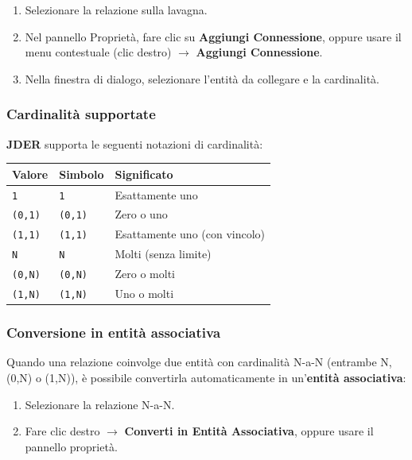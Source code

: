 \documentclass[a4paper,11pt]{article}
\newcommand{\uielement}[1]{\textbf{#1}}
\newcommand{\jder}{\textbf{JDER}}
\begin{document}
\begin{enumerate}
  \item Selezionare la relazione sulla lavagna.
  \item Nel pannello Proprietà, fare clic su \uielement{Aggiungi Connessione}, oppure usare il
        menu contestuale (clic destro) $\to$ \uielement{Aggiungi Connessione}.
  \item Nella finestra di dialogo, selezionare l'entità da collegare e la cardinalità.
\end{enumerate}

\subsubsection{Cardinalità supportate}

\jder{} supporta le seguenti notazioni di cardinalità:

\begin{center}
\begin{tabular}{@{}lll@{}}
  \toprule
  \textbf{Valore} & \textbf{Simbolo} & \textbf{Significato} \\
  \midrule
  \texttt{1}      & \texttt{1}       & Esattamente uno \\
  \texttt{(0,1)}  & \texttt{(0,1)}   & Zero o uno \\
  \texttt{(1,1)}  & \texttt{(1,1)}   & Esattamente uno (con vincolo) \\
  \texttt{N}      & \texttt{N}       & Molti (senza limite) \\
  \texttt{(0,N)}  & \texttt{(0,N)}   & Zero o molti \\
  \texttt{(1,N)}  & \texttt{(1,N)}   & Uno o molti \\
  \bottomrule
\end{tabular}
\end{center}

\subsubsection{Conversione in entità associativa}

Quando una relazione coinvolge due entità con cardinalità N-a-N (entrambe N, (0,N) o (1,N)),
è possibile convertirla automaticamente in un'\textbf{entità associativa}:

\begin{enumerate}
  \item Selezionare la relazione N-a-N.
  \item Fare clic destro $\to$ \uielement{Converti in Entità Associativa}, oppure usare il
        pannello proprietà.
\end{enumerate}
\end{document}
